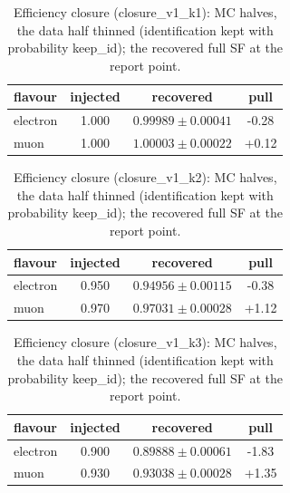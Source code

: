 \documentclass[11pt,a4paper]{article}
\begin{document}
\begin{table}[H]\centering\small\caption{Efficiency closure (closure\_v1\_k1): MC halves, the data half thinned (identification kept with probability keep\_id); the recovered full SF at the report point.}\begin{tabular}{lccc}\toprule flavour & injected & recovered & pull\\\midrule
electron & 1.000 & $0.99989\pm0.00041$ & -0.28\\
muon & 1.000 & $1.00003\pm0.00022$ & +0.12\\
\bottomrule\end{tabular}\end{table}
\begin{table}[H]\centering\small\caption{Efficiency closure (closure\_v1\_k2): MC halves, the data half thinned (identification kept with probability keep\_id); the recovered full SF at the report point.}\begin{tabular}{lccc}\toprule flavour & injected & recovered & pull\\\midrule
electron & 0.950 & $0.94956\pm0.00115$ & -0.38\\
muon & 0.970 & $0.97031\pm0.00028$ & +1.12\\
\bottomrule\end{tabular}\end{table}
\begin{table}[H]\centering\small\caption{Efficiency closure (closure\_v1\_k3): MC halves, the data half thinned (identification kept with probability keep\_id); the recovered full SF at the report point.}\begin{tabular}{lccc}\toprule flavour & injected & recovered & pull\\\midrule
electron & 0.900 & $0.89888\pm0.00061$ & -1.83\\
muon & 0.930 & $0.93038\pm0.00028$ & +1.35\\
\bottomrule\end{tabular}\end{table}
\end{document}
